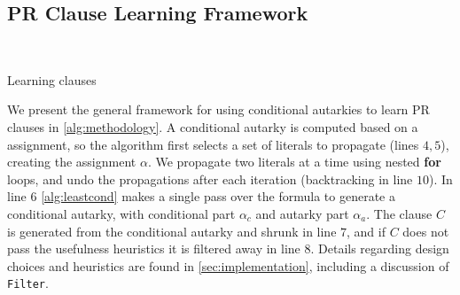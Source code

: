 
\subsection{PR Clause Learning Framework}~\label{subsec:methodology}

\begin{algorithm}\caption{Learning \pr clauses}\label{alg:methodology}
    \SetAlgoNoLine {}
     
     
     
      
\end{algorithm}

We present the general framework for using conditional autarkies to learn PR
clauses in \autoref{alg:methodology}. A conditional autarky is computed based on
a assignment, so the algorithm first selects a set of literals to propagate
(lines $4,5$), creating the assignment $\alpha$. We propagate two literals at a
time using nested \textbf{for} loops, and undo the propagations after each
iteration (backtracking in line $10$). In line $6$ \autoref{alg:leastcond}
makes a single pass over the formula to generate a conditional autarky, with
conditional part $\alpha_c$ and autarky part $\alpha_a$. The \pr clause $C$
is generated from the conditional autarky and shrunk in line $7$, and if $C$
does not pass the usefulness heuristics it is filtered away in line $8$. Details
regarding design choices and heuristics are found in
\autoref{sec:implementation}, including a discussion of \texttt{Filter}.

